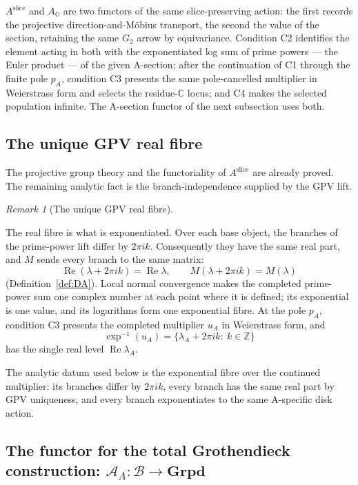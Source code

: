 \documentclass[11pt]{article}
\newcommand{\OO}{\mathbb{O}}
\newcommand{\CC}{\mathbb{C}}
\newcommand{\ZZ}{\mathbb{Z}}
\providecommand{\uses}[1]{}
\theoremstyle{plain}
\theoremstyle{definition}
\theoremstyle{remark}
\newtheorem{remark}[theorem]{Remark}
\begin{document}
$A^{\mathrm{slice}}$ and $A_{\OO}$ are two functors of the same slice-preserving
action: the first records the projective direction-and-M\"obius transport, the
second the value of the section, retaining the same $G_2$ arrow by
equivariance. Condition \textup{C2} identifies the element acting in both with
the exponentiated log sum of prime powers --- the Euler product --- of the
given A-section; after the continuation of \textup{C1} through the finite
pole $p_A$, condition \textup{C3} presents the same pole-cancelled multiplier
in Weierstrass form and selects the residue-$\CC$ locus; and \textup{C4}
makes the selected population infinite. The A-section functor of the next
subsection uses both.

\subsection*{The unique GPV real fibre}

The projective group theory and the functoriality of
$A^{\mathrm{slice}}$ are already proved. The remaining analytic fact is the
branch-independence supplied by the GPV lift.

\begin{remark}[The unique GPV real fibre]\label{rmk:gpv-real-fibre}
\uses{thm:winding-lift, lem:exp-degenerate}
The real fibre is what is exponentiated. Over each base object, the
branches of the prime-power lift differ by $2\pi ik$. Consequently they
have the same real part, and $M$ sends every branch to the same matrix:
\[
  \operatorname{Re}(\lambda+2\pi ik)=\operatorname{Re}\lambda,
  \qquad M(\lambda+2\pi ik)=M(\lambda)
\]
(Definition~\ref{def:DA}). Local normal convergence makes the completed
prime-power sum one complex number at each point where it is defined; its
exponential is one value, and its logarithms form one exponential fibre.
At the pole $p_A$, condition C3 presents the completed multiplier $u_A$ in
Weierstrass form, and
\[
  \exp^{-1}(u_A)=\{\lambda_A+2\pi ik:\ k\in\ZZ\}
\]
has the single real level $\operatorname{Re}\lambda_A$.
\end{remark}

The analytic datum used below is the exponential fibre
over the continued multiplier: its branches differ by $2\pi ik$, every
branch has the same real part by GPV uniqueness, and every branch
exponentiates to the same A-specific disk action.

\subsection*{The functor for the total Grothendieck construction:
$\mathcal A_A:\mathcal B\to\mathbf{Grpd}$}
\end{document}
